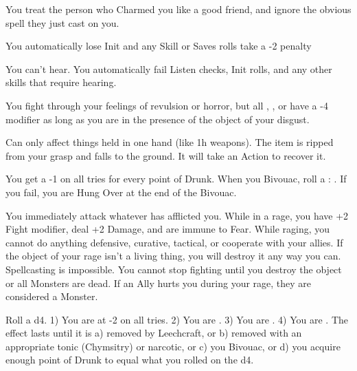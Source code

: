 {  

  You treat the person who Charmed you like a good friend, and ignore the obvious spell they just cast on you.


  You automatically lose Init and any Skill or Saves rolls take a -2 penalty


  You can't hear.  You automatically fail Listen checks, Init rolls, and any other skills that require hearing.


  You fight through your feelings of revulsion or horror, but all \RO, \RB, or \RS have a -4 modifier as long as you are in the presence of the object of your disgust.


  Can only affect things held in one hand (like 1h weapons). The item is ripped from your grasp and falls to the ground.  It will take an Action to recover it.


  You get a -1 on all \RO tries for every point of Drunk.  When you Bivouac, roll a \RS : \VIG.  If you fail, you are Hung Over at the end of the Bivouac.


  You immediately attack whatever has afflicted you. While in a rage, you have +2 Fight modifier, deal +2 Damage, and are immune to Fear. While raging, you cannot do anything defensive, curative, tactical, or cooperate with your allies. If the object of your rage isn't a living thing, you will destroy it any way you can. Spellcasting is impossible.  You cannot stop fighting until you destroy the object or all Monsters are dead.  If an Ally hurts you during your rage, they are considered a Monster.


  Roll a d4.  1) You are at -2 on all \RO tries.  2) You are .  3) You are . 4) You are .  The effect lasts until it is a) removed by Leechcraft, or b) removed with an appropriate tonic (Chymsitry) or narcotic, or c) you Bivouac, or d) you acquire enough point of Drunk to equal what you rolled on the d4.


}
